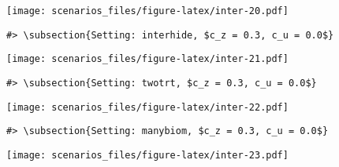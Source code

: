 \documentclass[
]{article}
\begin{document}
\texttt{[image: scenarios\_files/figure-latex/inter-20.pdf]}

\begin{verbatim}
#> \subsection{Setting: interhide, $c_z = 0.3, c_u = 0.0$}
\end{verbatim}

\texttt{[image: scenarios\_files/figure-latex/inter-21.pdf]}

\begin{verbatim}
#> \subsection{Setting: twotrt, $c_z = 0.3, c_u = 0.0$}
\end{verbatim}

\texttt{[image: scenarios\_files/figure-latex/inter-22.pdf]}

\begin{verbatim}
#> \subsection{Setting: manybiom, $c_z = 0.3, c_u = 0.0$}
\end{verbatim}

\texttt{[image: scenarios\_files/figure-latex/inter-23.pdf]}
\end{document}
